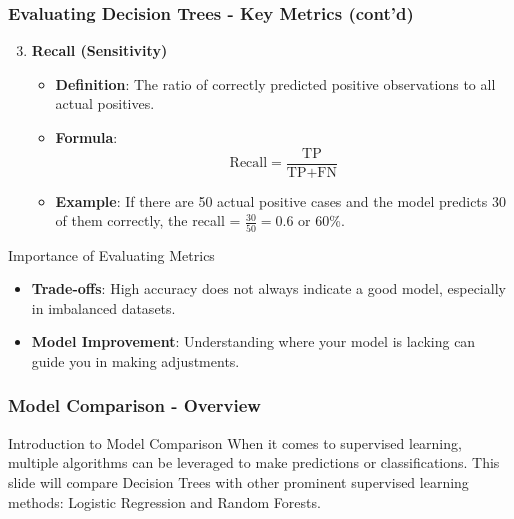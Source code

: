 \documentclass[aspectratio=169]{beamer}
\begin{document}
\begin{frame}[fragile]
    \frametitle{Evaluating Decision Trees - Key Metrics (cont'd)}
    \begin{enumerate}
        \setcounter{enumi}{2}
        \item \textbf{Recall (Sensitivity)}
            \begin{itemize}
                \item \textbf{Definition}: The ratio of correctly predicted positive observations to all actual positives.
                \item \textbf{Formula}:
                    \begin{equation}
                        \text{Recall} = \frac{\text{TP}}{\text{TP} + \text{FN}}
                    \end{equation}
                \item \textbf{Example}: If there are 50 actual positive cases and the model predicts 30 of them correctly, the recall = \( \frac{30}{50} = 0.6 \) or 60\%.
            \end{itemize}
    \end{enumerate}
    
    \begin{block}{Importance of Evaluating Metrics}
        \begin{itemize}
            \item \textbf{Trade-offs}: High accuracy does not always indicate a good model, especially in imbalanced datasets.
            \item \textbf{Model Improvement}: Understanding where your model is lacking can guide you in making adjustments.
        \end{itemize}
    \end{block}
\end{frame}

\begin{frame}[fragile]
    \frametitle{Model Comparison - Overview}
    
    \begin{block}{Introduction to Model Comparison}
        When it comes to supervised learning, multiple algorithms can be leveraged to make predictions or classifications. This slide will compare Decision Trees with other prominent supervised learning methods: Logistic Regression and Random Forests.
    \end{block}
\end{frame}
\end{document}
